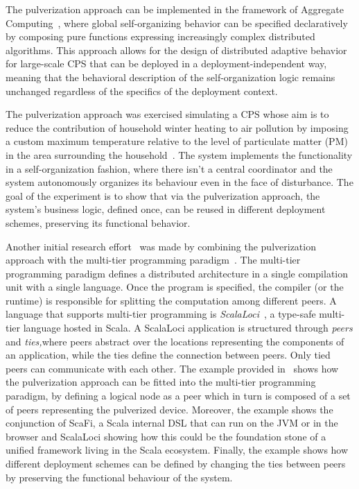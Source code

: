 The pulverization approach can be implemented in the framework of Aggregate Computing~\cite{beal2015aggregate}, where global self-organizing behavior
can be specified declaratively by composing pure functions expressing increasingly complex distributed algorithms.
This approach allows for the design of distributed adaptive behavior for large-scale CPS that can be deployed in a deployment-independent way,
meaning that the behavioral description of the self-organization logic remains unchanged regardless of the specifics of the deployment context.

The pulverization approach was exercised simulating a CPS whose aim is to reduce the contribution of household winter heating to air pollution by
imposing a custom maximum temperature relative to the level of particulate matter (PM) in the area surrounding the household~\cite{fi12110203}.
The system implements the functionality in a self-organization fashion, where there isn't a central coordinator and the system autonomously organizes
its behaviour even in the face of disturbance.
The goal of the experiment is to show that via the pulverization approach, the system's business logic, defined once, can be reused in different
deployment schemes, preserving its functional behavior.

Another initial research effort~\cite{9599177} was made by combining the pulverization approach with the multi-tier programming
paradigm~\cite{weisenburger2020survey}.
The multi-tier programming paradigm defines a distributed architecture in a single compilation unit with a single language. Once the program is
specified, the compiler (or the runtime) is responsible for splitting the computation among different peers.
A language that supports multi-tier programming is \emph{ScalaLoci}~\cite{weisenburger2018distributed, weisenburger2020implementing}, a type-safe
multi-tier language hosted in Scala.
A ScalaLoci application is structured through \emph{peers} and \emph{ties,}where peers abstract over the locations representing the components of an
application, while the ties define the connection between peers. Only tied peers can communicate with each other.
The example provided in~\cite{9599177} shows how the pulverization approach can be fitted into the multi-tier programming paradigm, by defining
a logical node as a peer which in turn is composed of a set of peers representing the pulverized device.
Moreover, the example shows the conjunction of ScaFi, a Scala internal DSL that can run on the JVM or in the browser and ScalaLoci showing
how this could be the foundation stone of a unified framework living in the Scala ecosystem.
Finally, the example shows how different deployment schemes can be defined by changing the ties between peers by preserving the functional behaviour
of the system.
